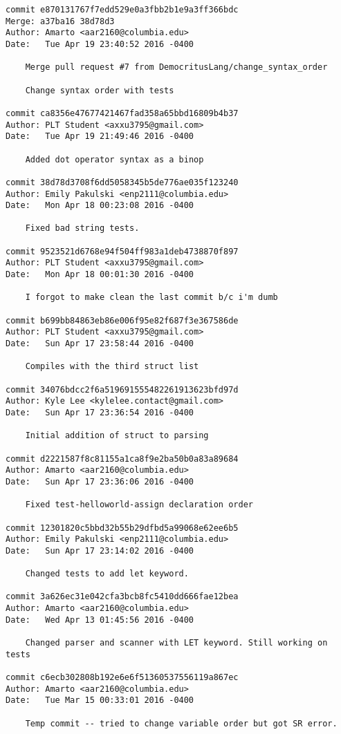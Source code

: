 \begin{lstlisting}[backgroundcolor=\color{white}]
commit e870131767f7edd529e0a3fbb2b1e9a3ff366bdc
Merge: a37ba16 38d78d3
Author: Amarto <aar2160@columbia.edu>
Date:   Tue Apr 19 23:40:52 2016 -0400

    Merge pull request #7 from DemocritusLang/change_syntax_order
    
    Change syntax order with tests

commit ca8356e47677421467fad358a65bbd16809b4b37
Author: PLT Student <axxu3795@gmail.com>
Date:   Tue Apr 19 21:49:46 2016 -0400

    Added dot operator syntax as a binop

commit 38d78d3708f6dd5058345b5de776ae035f123240
Author: Emily Pakulski <enp2111@columbia.edu>
Date:   Mon Apr 18 00:23:08 2016 -0400

    Fixed bad string tests.

commit 9523521d6768e94f504ff983a1deb4738870f897
Author: PLT Student <axxu3795@gmail.com>
Date:   Mon Apr 18 00:01:30 2016 -0400

    I forgot to make clean the last commit b/c i'm dumb

commit b699bb84863eb86e006f95e82f687f3e367586de
Author: PLT Student <axxu3795@gmail.com>
Date:   Sun Apr 17 23:58:44 2016 -0400

    Compiles with the third struct list

commit 34076bdcc2f6a519691555482261913623bfd97d
Author: Kyle Lee <kylelee.contact@gmail.com>
Date:   Sun Apr 17 23:36:54 2016 -0400

    Initial addition of struct to parsing

commit d2221587f8c81155a1ca8f9e2ba50b0a83a89684
Author: Amarto <aar2160@columbia.edu>
Date:   Sun Apr 17 23:36:06 2016 -0400

    Fixed test-helloworld-assign declaration order

commit 12301820c5bbd32b55b29dfbd5a99068e62ee6b5
Author: Emily Pakulski <enp2111@columbia.edu>
Date:   Sun Apr 17 23:14:02 2016 -0400

    Changed tests to add let keyword.

commit 3a626ec31e042cfa3bcb8fc5410dd666fae12bea
Author: Amarto <aar2160@columbia.edu>
Date:   Wed Apr 13 01:45:56 2016 -0400

    Changed parser and scanner with LET keyword. Still working on tests

commit c6ecb302808b192e6e6f51360537556119a867ec
Author: Amarto <aar2160@columbia.edu>
Date:   Tue Mar 15 00:33:01 2016 -0400

    Temp commit -- tried to change variable order but got SR error.


\end{lstlisting}
